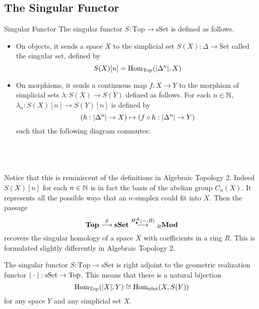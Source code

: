 \documentclass[a4paper]{article}
\begin{document}
\subsection{The Singular Functor}
\begin{defn}{Singular Functor}{} The singular functor $S:\text{Top}\to\text{sSet}$ is defined as follows. 
\begin{itemize}
\item On objects, it sends a space $X$ to the simplicial set $S(X):\Delta\to\text{Set}$ called the singular set, defined by $$S(X)[n]=\operatorname{Hom}_{\text{Top}}(\abs{\Delta^n},X)$$
\item On morphisms, it sends a continuous map $f:X\to Y$ to the morphism of simplicial sets $\lambda:S(X)\to S(Y)$ defined as follows. For each $n\in\mathbb{N}$, $\lambda_n:S(X)[n]\to S(Y)[n]$ is defined by $$\left(h:\abs{\Delta^n}\to X\right)\mapsto\left(f\circ h:\abs{\Delta^n}\to Y\right)$$ such that the following diagram commutes: \\~\\
\\~\\
\end{itemize}
\end{defn}

Notice that this is reminiscent of the definitions in Algebraic Topology 2. Indeed $S(X)[n]$  for each $n\in\mathbb{N}$ is in fact the basis of the abelian group $C_n(X)$. It represents all the possible ways that an $n$-simplex could fit into $X$. Then the passage $$\bold{Top}\overset{S}{\longrightarrow}\bold{sSet}\overset{H_\bullet^\Delta(-;R)}{\longrightarrow}{_R\bold{Mod}}$$ recovers the singular homology of a space $X$ with coefficients in a ring $R$. This is formulated slightly differently in Algebraic Topology 2. 

\begin{thm}{}{} The singular functor $S:\text{Top}\to\text{sSet}$ is right adjoint to the geometric realization functor $\abs{\;\cdot\;}:\text{sSet}\to\text{Top}$. This means that there is a natural bijection $$\operatorname{Hom}_\text{Top}(\abs{X},Y)\cong\operatorname{Hom}_\text{sSet}(X,S(Y))$$ for any space $Y$ and any simplicial set $X$. 
\end{thm}
\end{document}
